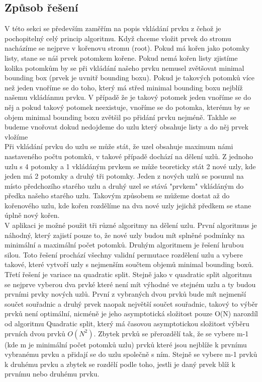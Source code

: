 \documentclass[12pt,a4paper]{article}
\begin{document}
\subsection*{Způsob řešení}
V této sekci se především zaměřím na popis vkládání prvku z čehož je pochopitelný celý princip algoritmu. Když chceme vložit prvek do stromu nacházíme se nejprve v kořenovu stromu (root). Pokud má kořen jako potomky listy, stane se náš prvek potomkem kořene. Pokud nemá kořen listy zjistíme kolika potomkům by se při vkládání našeho prvku nemusel zvětšovat minimal bounding box (prvek je uvnitř bounding boxu). Pokud je takových potomků více než jeden vnoříme se do toho, který má střed minimal bounding boxu nejblíž našemu vkládánmu prvku. V případě že je takový potomek jeden vnoříme se do něj a pokud takový potomek neexistuje, vnoříme se do potomka, kterému by se objem minimal bounding boxu zvětšil po přidání prvku nejméně. Takhle se budeme vnořovat dokud nedojdeme do uzlu který obsahuje listy a do něj prvek vložíme\\[0.6cm]

Při vkládání prvku do uzlu se může stát, že uzel obsahuje maximum námi nastaveného počtu potomků, v takové případě dochází na dělení uzlů. Z jednoho uzlu s 4 potomky a 1 vkládáným prvkem se může teoreticky stát 2 nové uzly, kde jeden má 2 potomky a druhý tři potomky. Jeden z nových uzlů se posunul na místo předchozího starého uzlu a druhý uzel se stává "prvkem" vkládáným do předka našeho starého uzlu. Takovým způsobem se můžeme dostat až do kořenového uzlu, kde kořen rozdělíme na dva nové uzly jejichž předkem se stane úplně nový kořen.\\[0.6cm]

V aplikaci je možné použit tři různé algoritmy na dělení uzlu. První algoritmus je náhodný, který zajistí pouze to, že nové uzly budou mít splněné podmínky na minimální a maximální počet potomků. Druhým algoritmem je řešení hrubou silou. Toto řešení prochází všechny validní permutace rozdělení uzlu a vybere takové, které vytvoří uzly s nejmenším součtem objemů minimal bounding boxů. Třetí řešení je variace\cite{nodeSplitting} na quadratic split. Stejně jako v quadratic split algoritmu se nejprve vyberou dva prvké které není mít výhodné ve stejném uzlu a ty budou prvními prvky nových uzlů. První z vybraných dvou prvků bude mít nejmenší součet souřadnic a druhý prvek naopak největší součet souřadnic, takový to výběr prvků není optimální, nicméně je jeho asymptotická složitost pouze O(N) narozdíl od algoritmu Quadratic split, který má časovou asymptotickou složitost výběru prvních dvou prvků $O(N^2)$\cite{original}. Zbytek prvků se přerozdělí tak, že se vybere m-1 (kde m je minimální počet potomků uzlu) prvků které jsou nejblíže k prvnímu vybranému prvku a přidají se do uzlu společně s ním. Stejně se vybere m-1 prvků k druhému prvku a zbytek se rozdělí podle toho, jestli je daný prvek blíž k prvnímu nebo druhému prvku.
\par \bigskip
\end{document}
